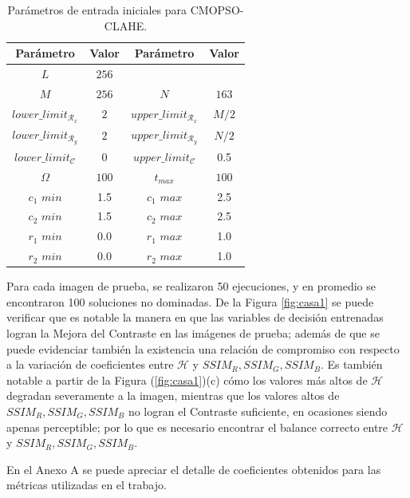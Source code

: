 \begin{table}[H]
\setlength{\abovecaptionskip}{2pt plus 3pt minus 2pt} %
\caption[Parámetros de entrada para $MOPSO$]{Parámetros de entrada iniciales para CMOPSO-CLAHE.}
\begin{center}
 \begin{tabular}{||c c | c c||} 
 \hline
 Parámetro & Valor & Parámetro & Valor \\ [0.5ex] 
 \hline\hline
 $L$ & $256$ &     &       \\ 
 \hline
 $M$ & $256$ & $N$ & $163$ \\ 
 \hline
 $lower\_limit_{\mathscr{R}_x}$ & $2$ & $upper\_limit_{\mathscr{R}_x}$ & $M/2$ \\ 
 \hline
 $lower\_limit_{\mathscr{R}_y}$ & $2$ & $upper\_limit_{\mathscr{R}_y}$ & $N/2$ \\  
 \hline
 $lower\_limit_{{\mathscr{C}}}$ & $0$ & $upper\_limit_{{\mathscr{C}}}$ & 0.5 \\
\hline
$\Omega$ & $100$ & $t_{max}$ & $100$ \\ 
\hline
$c_1$ $min$ & 1.5 & $c_1$ $max$ & 2.5 \\ 
\hline
$c_2$ $min$ & 1.5 & $c_2$ $max$ & 2.5 \\ 
\hline
$r_1$ $min$ & 0.0 & $r_1$ $max$ & 1.0 \\ 
\hline
$r_2$ $min$ & 0.0 & $r_2$ $max$ & 1.0 \\
\hline
\end{tabular}
\end{center}
\label{table:parametrospso}
\end{table}

Para cada imagen de prueba, se realizaron 50 ejecuciones, y en promedio se encontraron 100 soluciones no dominadas. De la Figura \ref{fig:casa1} se puede verificar que es notable la manera en que las variables de decisión entrenadas logran la Mejora del Contraste en las imágenes de prueba; además de que se puede evidenciar también la existencia una relación de compromiso con respecto a la variación de coeficientes entre $\mathscr{H}$ y $SSIM_R,SSIM_G,SSIM_B$. Es también notable a partir de la Figura (\ref{fig:casa1})(c) cómo los valores más altos de $\mathscr{H}$ degradan severamente a la imagen, mientras que los valores altos de $SSIM_R,SSIM_G,SSIM_B$ no logran el Contraste suficiente, en ocasiones siendo apenas perceptible; por lo que es necesario encontrar el balance correcto entre $\mathscr{H}$ y $SSIM_R,SSIM_G,SSIM_B$.

En el Anexo A se puede apreciar el detalle de coeficientes obtenidos para las métricas utilizadas en el trabajo.

